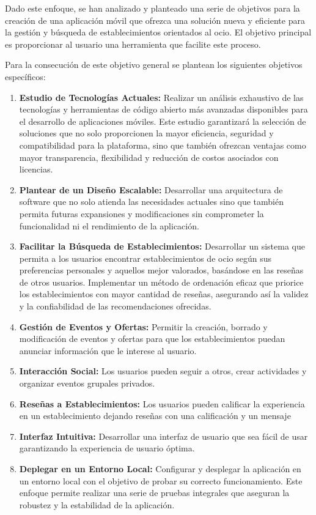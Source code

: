 Dado este enfoque, se han analizado y planteado una serie de objetivos para la creación de una aplicación móvil
que ofrezca una solución nueva y eficiente para la gestión y búsqueda de establecimientos orientados al ocio. El
objetivo principal es proporcionar al usuario una herramienta que facilite este proceso.

Para la consecución de este objetivo general se plantean los siguientes objetivos específicos:

\begin{enumerate}
      \item \textbf{Estudio de Tecnologías Actuales: }Realizar un análisis exhaustivo de las tecnologías y herramientas de código abierto más avanzadas disponibles para el desarrollo de aplicaciones móviles. Este estudio garantizará la selección de soluciones que no solo proporcionen la mayor eficiencia, seguridad y compatibilidad para la plataforma, sino que también ofrezcan ventajas como mayor transparencia, flexibilidad y reducción de costos asociados con licencias.
      \item \textbf{Plantear de un Diseño Escalable: }Desarrollar una arquitectura de software que no solo atienda las necesidades actuales sino que también permita futuras expansiones y modificaciones sin comprometer la funcionalidad ni el rendimiento de la aplicación.
      \item \textbf{Facilitar la Búsqueda de Establecimientos:} Desarrollar un sistema que permita a los usuarios encontrar establecimientos de ocio según sus preferencias personales y aquellos mejor valorados, basándose en las reseñas de otros usuarios. Implementar un método de ordenación eficaz que priorice los establecimientos con mayor cantidad de reseñas, asegurando así la validez y la confiabilidad de las recomendaciones ofrecidas.
      \item \textbf{Gestión de Eventos y Ofertas:} Permitir la creación, borrado y modificación de eventos y
            ofertas para que los establecimientos puedan anunciar información que le interese al usuario.
      \item \textbf{Interacción Social:} Los usuarios pueden seguir a otros, crear actividades y organizar eventos
            grupales privados.
      \item \textbf{Reseñas a Establecimientos:} Los usuarios pueden calificar la experiencia en un
            establecimiento dejando reseñas con una calificación y un mensaje
      \item \textbf{Interfaz Intuitiva:} Desarrollar una interfaz de usuario que sea fácil de usar garantizando la
            experiencia de usuario óptima.
      \item \textbf{Deplegar en un Entorno Local: }Configurar y desplegar la aplicación en un entorno local con el objetivo de probar su correcto funcionamiento. Este enfoque permite realizar una serie de pruebas integrales que aseguran la robustez y la estabilidad de la aplicación.
\end{enumerate}


